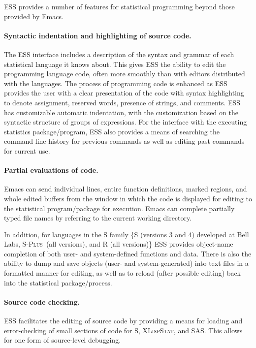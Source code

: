 \documentclass{article}
\newcommand*{\Splus}{\textsc{S-Plus}}
\newcommand*{\XLispStat}{\textsc{XLispStat}}
\begin{document}
ESS provides a number of features for statistical programming beyond
those provided by Emacs.

\paragraph{Syntactic indentation and highlighting of source code.}
The ESS interface includes a description of the syntax and grammar of
each statistical language it knows about.  This gives ESS the ability
to edit the programming language code, often more smoothly than with
editors distributed with the languages.  The process of programming
code is enhanced as ESS provides the user with a clear presentation of
the code with syntax highlighting to denote assignment, reserved
words, presence of strings, and comments.  ESS has customizable
automatic indentation, with the customization based on the syntactic
structure of groups of expressions.
For the interface with the executing statistics package/program,
ESS also provides a means of searching the command-line history for
previous commands as well as editing past commands for current use.

\paragraph{Partial evaluations of code.}
Emacs can send individual lines, entire function definitions, marked
regions, and whole edited buffers from the window in which the code is
displayed for editing to the statistical program/package for
execution.  Emacs can complete partially typed file
names by referring to the current working directory.

In addition, for languages in the S family \{S
(versions 3 and 4) developed at Bell Labs, \Splus\ (all versions), and
R (all versions)\} ESS provides object-name completion of both user- and
system-defined functions and data.  There is also the ability to dump
and save objects (user- and system-generated) into text files in a
formatted manner for editing, as well as to reload (after possible
editing) back into the statistical package/process.

\paragraph{Source code checking.}
ESS facilitates the editing of source code by providing a means
for loading and error-checking of small sections of code for S,
\XLispStat, and SAS.  This allows for one form of source-level
debugging.
\end{document}
